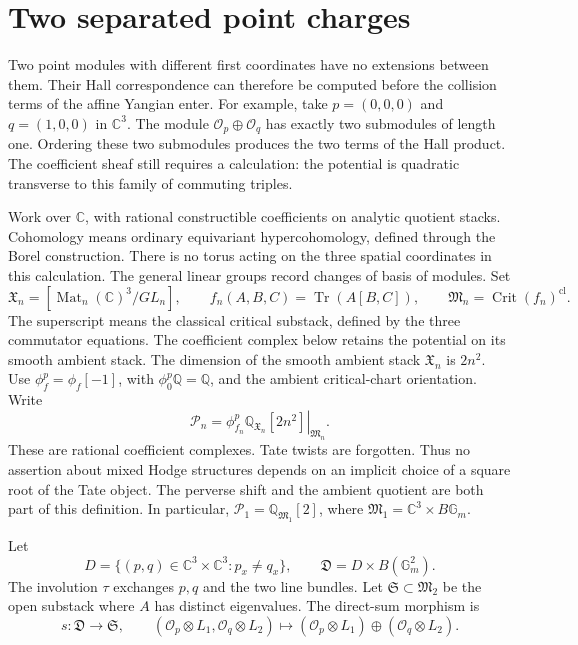 \section{Two separated point charges}
\label{sec:c3-separated-hall}

Two point modules with different first coordinates have no extensions
between them. Their Hall correspondence can therefore be computed
before the collision terms of the affine Yangian enter.
For example, take $p=(0,0,0)$ and $q=(1,0,0)$ in $\mathbb C^3$.
The module $\mathcal O_p\oplus\mathcal O_q$ has exactly two submodules
of length one. Ordering these two submodules produces the two terms
of the Hall product. The coefficient sheaf still requires a calculation:
the potential is quadratic transverse to this family of commuting triples.

Work over $\mathbb C$, with rational constructible coefficients on
analytic quotient stacks. Cohomology means ordinary equivariant
hypercohomology, defined through the Borel construction.
There is no torus acting on the three spatial coordinates in this
calculation. The general linear groups record changes of basis of modules.
Set
\[
 \mathfrak X_n=[\operatorname{Mat}_n(\mathbb C)^3/GL_n],\qquad
 f_n(A,B,C)=\operatorname{Tr}(A[B,C]),\qquad
 \mathfrak M_n=\operatorname{Crit}(f_n)^{\mathrm{cl}}.
\]
The superscript means the classical critical substack, defined by
the three commutator equations. The coefficient complex below retains
the potential on its smooth ambient stack.
The dimension of the smooth ambient stack $\mathfrak X_n$ is $2n^2$.
Use $\phi_f^p=\phi_f[-1]$, with $\phi_0^p\mathbb Q=\mathbb Q$,
and the ambient critical-chart orientation. Write
\[
 \mathcal P_n=
 \left.\phi_{f_n}^p\mathbb Q_{\mathfrak X_n}[2n^2]
 \right|_{\mathfrak M_n}.
\]
These are rational coefficient complexes. Tate twists are forgotten.
Thus no assertion about mixed Hodge structures depends on an implicit
choice of a square root of the Tate object.
The perverse shift and the ambient quotient are both part of this
definition. In particular, $\mathcal P_1=\mathbb Q_{\mathfrak M_1}[2]$,
where $\mathfrak M_1=\mathbb C^3\times B\mathbb G_m$.

Let
\[
 D=\{(p,q)\in\mathbb C^3\times\mathbb C^3:p_x\ne q_x\},\qquad
 \mathfrak D=D\times B(\mathbb G_m^2).
\]
The involution $\tau$ exchanges $p,q$ and the two line bundles.
Let $\mathfrak S\subset\mathfrak M_2$ be the open substack where $A$
has distinct eigenvalues. The direct-sum morphism is
\[
 s:\mathfrak D\longrightarrow\mathfrak S,\qquad
 (\mathcal O_p\otimes L_1,\mathcal O_q\otimes L_2)
 \longmapsto(\mathcal O_p\otimes L_1)\oplus(\mathcal O_q\otimes L_2).
\]

